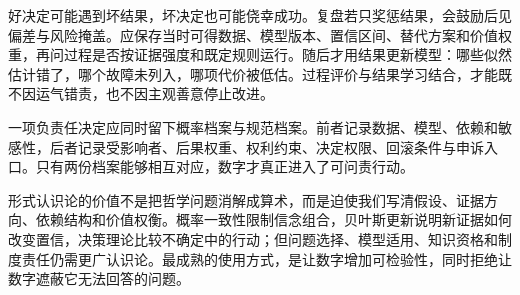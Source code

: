 好决定可能遇到坏结果，坏决定也可能侥幸成功。复盘若只奖惩结果，会鼓励后见偏差与风险掩盖。应保存当时可得数据、模型版本、置信区间、替代方案和价值权重，再问过程是否按证据强度和既定规则运行。随后才用结果更新模型：哪些似然估计错了，哪个故障未列入，哪项代价被低估。过程评价与结果学习结合，才能既不因运气错责，也不因主观善意停止改进。

\begin{argumentbox}
一项负责任决定应同时留下概率档案与规范档案。前者记录数据、模型、依赖和敏感性，后者记录受影响者、后果权重、权利约束、决定权限、回滚条件与申诉入口。只有两份档案能够相互对应，数字才真正进入了可问责行动。
\end{argumentbox}

形式认识论的价值不是把哲学问题消解成算术，而是迫使我们写清假设、证据方向、依赖结构和价值权衡。概率一致性限制信念组合，贝叶斯更新说明新证据如何改变置信，决策理论比较不确定中的行动；但问题选择、模型适用、知识资格和制度责任仍需更广认识论。最成熟的使用方式，是让数字增加可检验性，同时拒绝让数字遮蔽它无法回答的问题。
